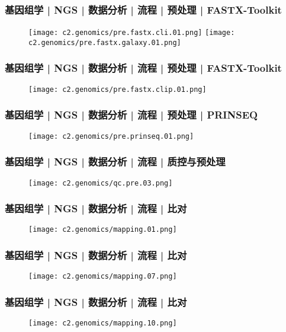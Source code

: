\begin{frame}
  \frametitle{基因组学 | NGS | 数据分析 | 流程 | 预处理 | FASTX-Toolkit}
  \begin{figure}
    \centering
    \texttt{[image: c2.genomics/pre.fastx.cli.01.png]}
    \texttt{[image: c2.genomics/pre.fastx.galaxy.01.png]}
  \end{figure}
\end{frame}

\begin{frame}
  \frametitle{基因组学 | NGS | 数据分析 | 流程 | 预处理 | FASTX-Toolkit}
  \begin{figure}
    \centering
    \texttt{[image: c2.genomics/pre.fastx.clip.01.png]}
  \end{figure}
\end{frame}

\begin{frame}
  \frametitle{基因组学 | NGS | 数据分析 | 流程 | 预处理 | PRINSEQ}
  \begin{figure}
    \centering
    \texttt{[image: c2.genomics/pre.prinseq.01.png]}
  \end{figure}
\end{frame}

\begin{frame}
  \frametitle{基因组学 | NGS | 数据分析 | 流程 | 质控与预处理}
  \begin{figure}
    \centering
    \texttt{[image: c2.genomics/qc.pre.03.png]}
  \end{figure}
\end{frame}

\begin{frame}
  \frametitle{基因组学 | NGS | 数据分析 | 流程 | 比对}
  \begin{figure}
    \centering
    \texttt{[image: c2.genomics/mapping.01.png]}
  \end{figure}
\end{frame}

\begin{frame}
  \frametitle{基因组学 | NGS | 数据分析 | 流程 | 比对}
  \begin{figure}
    \centering
    \texttt{[image: c2.genomics/mapping.07.png]}
  \end{figure}
\end{frame}

\begin{frame}
  \frametitle{基因组学 | NGS | 数据分析 | 流程 | 比对}
  \begin{figure}
    \centering
    \texttt{[image: c2.genomics/mapping.10.png]}
  \end{figure}
\end{frame}

